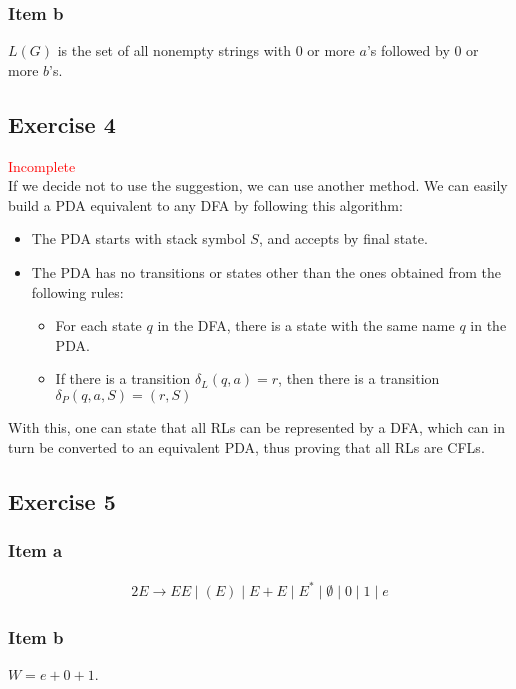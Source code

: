 \documentclass[docid=TP08]{tcom_TP}
\begin{document}
{\subsubsection{Item b}
$L(G)$ is the set of all nonempty strings with 0 or more $a$'s followed by 0 or more $b$'s.
\subsection{Exercise 4}
\textcolor{red}{Incomplete}\\
If we decide not to use the suggestion, we can use another method. We can easily build a PDA equivalent to any DFA by following this algorithm:
\begin{itemize}
	\item The PDA starts with stack symbol $S$, and accepts by final state.
	\item The PDA has no transitions or states other than the ones obtained from the following rules:
	\begin{itemize}
		\item For each state $q$ in the DFA, there is a state with the same name $q$ in the PDA.
		\item If there is a transition $\delta_L(q,a)=r$, then there is a transition $\delta_P(q,a,S)=(r,S)$
	\end{itemize}
\end{itemize}
With this, one can state that all RLs can be represented by a DFA, which can in turn be converted to an equivalent PDA, thus proving that all RLs are CFLs.
\pagebreak
\subsection{Exercise 5}
\subsubsection{Item a}
\begin{alignat*}{2}
	E \rightarrow EE\mid (E)\mid E+E\mid E^*\mid \emptyset\mid 0\mid 1\mid e
\end{alignat*}
\subsubsection{Item b}
$W=e+0+1$.\\
\begin{minipage}[t]{0.49\textwidth}
\begin{center}
\end{center}
\end{minipage}%
\begin{minipage}[t]{0.49\textwidth}
\begin{center}
\end{center}
\end{minipage}
}
\end{document}

